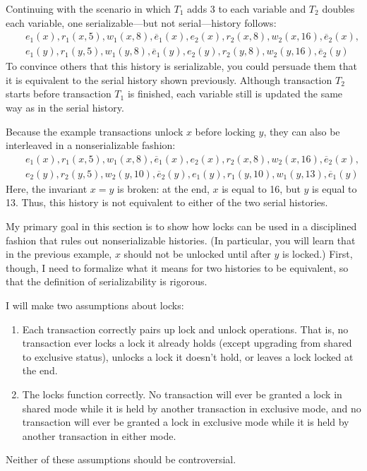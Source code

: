Continuing with the scenario in which $T_1$ adds 3 to each variable
and $T_2$ doubles each variable, one serializable---but not serial---history follows:
\begin{eqnarray*}
&&e_1(x), r_1(x, 5), w_1(x, 8), \overline{e}_1(x),
  e_2(x), r_2(x, 8), w_2(x, 16), \overline{e}_2(x),\\
&&e_1(y), r_1(y, 5), w_1(y, 8), \overline{e}_1(y),
  e_2(y), r_2(y, 8), w_2(y, 16), \overline{e}_2(y)
\end{eqnarray*}
To convince others that this history is serializable, you could
persuade them that it is equivalent to the serial history shown
previously.  Although transaction $T_2$ starts before transaction $T_1$ is
finished, each variable still is updated the same way as in the
serial history.

Because the example transactions unlock $x$ before locking $y$, they
can also be interleaved in a nonserializable fashion:
\begin{eqnarray*}
&&e_1(x), r_1(x, 5), w_1(x, 8), \overline{e}_1(x),
  e_2(x), r_2(x, 8), w_2(x, 16), \overline{e}_2(x),\\
&&e_2(y), r_2(y, 5), w_2(y, 10), \overline{e}_2(y),
  e_1(y), r_1(y, 10), w_1(y, 13), \overline{e}_1(y)
\end{eqnarray*}
Here, the invariant $x=y$ is broken: at the end, $x$ is equal to 16,
but $y$ is equal to 13.  Thus, this history is not equivalent to
either of the two serial histories.

My primary goal in this section is to show how locks can be used in a
disciplined fashion that rules out nonserializable histories.  (In
particular, you will learn that in the previous example, $x$ should not be
unlocked until after $y$ is locked.)  First, though, I need to
formalize what it means for two histories to be equivalent, so that
the definition of serializability is rigorous.

I will make two assumptions about locks:
\begin{enumerate}
\item
Each transaction correctly pairs up lock and unlock operations.  That
is, no transaction ever locks a lock it already holds (except
upgrading from shared to exclusive status), unlocks a lock it doesn't
hold, or leaves a lock locked at the end.
\item
The locks function correctly.  No transaction will ever be granted a
lock in shared mode while it is held by another transaction in
exclusive mode, and no transaction will ever be granted a lock in
exclusive mode while it is held by another transaction in either
mode.
\end{enumerate}
Neither of these assumptions should be controversial.

